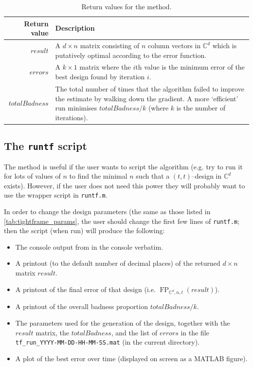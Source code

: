 \documentclass{article}
\newcommand{\C}{\mathbb{C}}
\DeclareMathOperator{\FP}{FP}
\theoremstyle{definition}
\begin{document}
  \begin{table}
    \begin{threeparttable}
    \begin{tabularx}{\linewidth}{r|X}
      \textbf{Return value} & \textbf{Description} \\\hline
      $result$ & A $ d \times n $ matrix consisting of $ n $ column vectors in $ \C^d $ which is putatively optimal
                 according to the error function.\\
      $errors$ & A $ k \times 1 $ matrix where the $ i$th value is the minimum error of the best design found by
                 iteration $ i $.\\
      $totalBadness$ & The total number of times that the algorithm failed to improve the estimate by walking
                       down the gradient. A more `efficient' run minimises $ totalBadness/k $ (where $ k $ is the
                       number of iterations).
    \end{tabularx}
    \end{threeparttable}
    \caption{Return values for the  method.\label{tab:tightframe_returns}}
  \end{table}
  
  \subsection{The \texttt{runtf} script}
  The  method is useful if the user wants to script the algorithm (e.g. try to run it for
  lots of values of $ n $ to find the minimal $ n $ such that a $ (t,t)$--design in $ \C^d $ exists). However,
  if the user does not need this power they will probably want to use the wrapper script in \texttt{runtf.m}.
  
  In order to change the design parameters (the same as those listed in \cref{tab:tightframe_params}, the user
  should change the first few lines of \texttt{runtf.m}; then the script (when run) will produce the following:
  \begin{itemize}
    \item The console output from  in the console verbatim.
    \item A printout (to the default number of decimal places) of the returned $ d \times n $ matrix $ result $.
    \item A printout of the final error of that design (i.e. $ \FP_{\C^d,n,t}(result) $).
    \item A printout of the overall badness proportion $ totalBadness/k $.
    \item The parameters used for the generation of the design, together with the $ result $ matrix, the $ totalBadness $, and the list of $ errors $
          in the file \verb|tf_run_YYYY-MM-DD-HH-MM-SS.mat| (in the current directory).
    \item A plot of the best error over time (displayed on screen as a MATLAB figure).
  \end{itemize}
\end{document}
